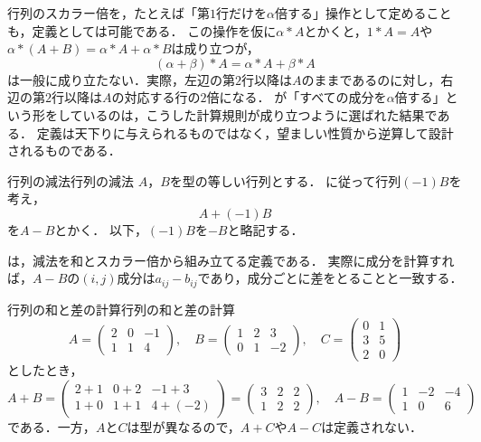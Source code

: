 \begin{remark}[スカラー倍の定義の設計]
  行列のスカラー倍を，たとえば「第$1$行だけを$\alpha$倍する」操作として定めることも，定義としては可能である．
  この操作を仮に$\alpha \ast A$とかくと，$1 \ast A = A$や$\alpha \ast (A + B) = \alpha \ast A + \alpha \ast B$は成り立つが，
  \[
    (\alpha + \beta) \ast A = \alpha \ast A + \beta \ast A
  \]
  は一般に成り立たない．実際，左辺の第$2$行以降は$A$のままであるのに対し，右辺の第$2$行以降は$A$の対応する行の$2$倍になる．
  が「すべての成分を$\alpha$倍する」という形をしているのは，こうした計算規則が成り立つように選ばれた結果である．
  定義は天下りに与えられるものではなく，望ましい性質から逆算して設計されるものである．
\end{remark}

\begin{definition}{行列の減法}{行列の減法}
  $A$，$B$を型の等しい行列とする．
  に従って行列$(-1)B$を考え，
  \[
    A + (-1)B
  \]
  を$A - B$とかく．
  以下，$(-1)B$を$-B$と略記する．
\end{definition}

は，減法を和とスカラー倍から組み立てる定義である．
実際に成分を計算すれば，$A - B$の$(i, j)$成分は$a_{ij} - b_{ij}$であり，成分ごとに差をとることと一致する．

\begin{example}{行列の和と差の計算}{行列の和と差の計算}
  \[
    A = \begin{pmatrix} 2 & 0 & -1 \\ 1 & 1 & 4 \end{pmatrix}, \quad
    B = \begin{pmatrix} 1 & 2 & 3 \\ 0 & 1 & -2 \end{pmatrix}, \quad
    C = \begin{pmatrix} 0 & 1 \\ 3 & 5 \\ 2 & 0 \end{pmatrix}
  \]
  としたとき，
  \[
    A + B =
    \begin{pmatrix}
      2 + 1 & 0 + 2 & -1 + 3 \\
      1 + 0 & 1 + 1 & 4 + (-2)
    \end{pmatrix}
    =
    \begin{pmatrix}
      3 & 2 & 2 \\
      1 & 2 & 2
    \end{pmatrix}, \quad
    A - B =
    \begin{pmatrix}
      1 & -2 & -4 \\
      1 & 0 & 6
    \end{pmatrix}
  \]
  である．一方，$A$と$C$は型が異なるので，$A + C$や$A - C$は定義されない．
\end{example}

